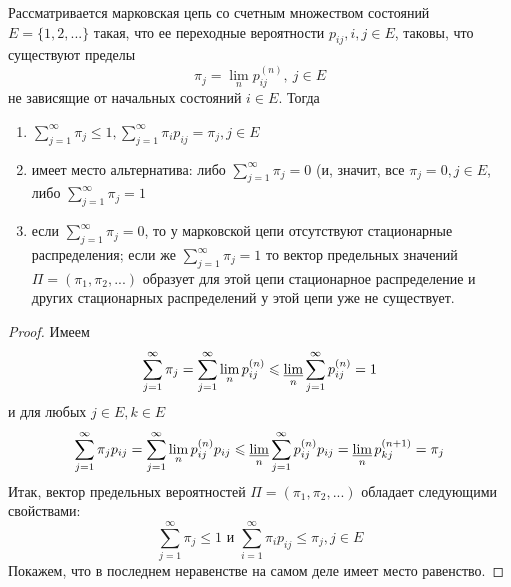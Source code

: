 \begin{theorem}\label{th1}

Рассматривается марковская цепь со счетным множеством состояний $E = \{1,2, ...\}$ такая, что ее переходные вероятности $p_{ij}, i, j \in E$, таковы, что существуют пределы
$$
\pi_j = \lim_n p_{ij}^{(n)}, \  j \in E
$$
не зависящие от начальных состояний $i \in E$. Тогда
\begin{enumerate}[label=(\alph*)]
    \item $\sum\limits_{j = 1}^{\infty} \pi_j \leq 1, \sum\limits_{j = 1}^{\infty} \pi_i p_{ij} = \pi_j, j \in E$
    \item имеет место альтернатива: либо $\sum\limits_{j = 1}^{\infty} \pi_j = 0$ (и, значит, все $\pi_j = 0, j \in E$, либо $\sum\limits_{j = 1}^{\infty} \pi_j = 1$
    \item если $\sum\limits_{j = 1}^{\infty} \pi_j = 0$, то у марковской цепи отсутствуют стационарные распределения; если же $\sum\limits_{j = 1}^{\infty} \pi_j = 1$ то вектор предельных значений $\Pi = (\pi_1, \pi_2, ...)$ образует для этой цепи стационарное распределение и других стационарных распределений у этой цепи уже не существует.
\end{enumerate}

\begin{proof}

Имеем
\begin{equation}\label{eq1}
\sum_{j = 1}^{\infty} \pi_j = \sum_{j = 1}^{\infty} \lim_n p_{ij}^{(n)} \leq \varliminf_n \sum_{j = 1}^{\infty} p_{ij}^{(n)} = 1
\end{equation}
и для любых $j \in E, k \in E$
\begin{equation}\label{eq2}
\sum_{j = 1}^{\infty} \pi_j p_{ij} = \sum_{j = 1}^{\infty} \lim_n p_{ij}^{(n)} p_{ij} \leq \varliminf_n \sum_{j = 1}^{\infty} p_{ij}^{(n)} p_{ij} = \varliminf_n p_{kj}^{(n + 1)} = \pi_j
\end{equation}
Итак, вектор предельных вероятностей $\Pi = (\pi_1, \pi_2, ...)$ обладает следующими свойствами:
\begin{equation}\label{eq3}
\sum_{j = 1}^{\infty} \pi_j \leq 1 \text{ и } \sum_{i = 1}^{\infty} \pi_i p_{ij} \leq \pi_j, j \in E
\end{equation}
Покажем, что в последнем неравенстве на самом деле имеет место равенство.


\end{proof}
\end{theorem}
